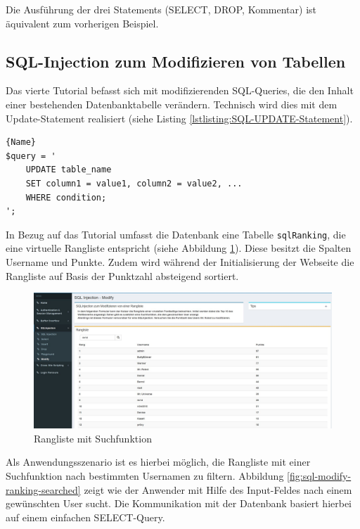 Die Ausführung der drei Statements (SELECT, DROP, Kommentar) ist äquivalent zum vorherigen Beispiel.

\subsection{SQL-Injection zum Modifizieren von Tabellen}
Das vierte Tutorial befasst sich mit modifizierenden SQL-Queries, die den Inhalt einer bestehenden Datenbanktabelle verändern. Technisch wird dies mit dem Update-Statement realisiert (siehe Listing \ref{lstlisting:SQL-UPDATE-Statement}).

\begin{lstlisting}[caption=SQL-UPDATE-Statement\label{lstlisting:SQL-UPDATE-Statement}]{Name}
$query = '
	UPDATE table_name
	SET column1 = value1, column2 = value2, ...
	WHERE condition; 
';
\end{lstlisting}
In Bezug auf das Tutorial umfasst die Datenbank eine Tabelle \colorbox{altgray}{\lstinline|sqlRanking|}, die eine virtuelle Rangliste entspricht (siehe Abbildung \ref{fig:sql-modify-ranking}). Diese besitzt die Spalten Username und Punkte. Zudem wird während der Initialisierung der Webseite die Rangliste auf Basis der Punktzahl absteigend sortiert.

\begin{figure}[H]
	\centering
	\includegraphics[width=\textwidth]{images/SQL_Injection/sql_modify.jpg}
	\caption{Rangliste mit Suchfunktion}
	\label{fig:sql-modify-ranking}
\end{figure}

Als Anwendungsszenario ist es hierbei möglich, die Rangliste mit einer Suchfunktion nach bestimmten Usernamen zu filtern. Abbildung \ref{fig:sql-modify-ranking-searched} zeigt wie der Anwender mit Hilfe des Input-Feldes nach einem gewünschten User sucht. Die Kommunikation mit der Datenbank basiert hierbei auf einem einfachen SELECT-Query.

